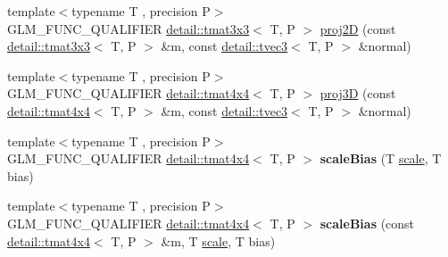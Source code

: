 \begin{DoxyCompactItemize}
\item 
{\footnotesize template$<$typename T , precision P$>$ }\\G\+L\+M\+\_\+\+F\+U\+N\+C\+\_\+\+Q\+U\+A\+L\+I\+F\+I\+ER \hyperlink{structglm_1_1detail_1_1tmat3x3}{detail\+::tmat3x3}$<$ T, P $>$ \hyperlink{group__gtx__transform2_gad51e1fa33875b966db2f97cb7f21c48a}{proj2D} (const \hyperlink{structglm_1_1detail_1_1tmat3x3}{detail\+::tmat3x3}$<$ T, P $>$ \&m, const \hyperlink{structglm_1_1detail_1_1tvec3}{detail\+::tvec3}$<$ T, P $>$ \&normal)
\item 
{\footnotesize template$<$typename T , precision P$>$ }\\G\+L\+M\+\_\+\+F\+U\+N\+C\+\_\+\+Q\+U\+A\+L\+I\+F\+I\+ER \hyperlink{structglm_1_1detail_1_1tmat4x4}{detail\+::tmat4x4}$<$ T, P $>$ \hyperlink{group__gtx__transform2_ga70a21b940727b94060fd3826eeacb048}{proj3D} (const \hyperlink{structglm_1_1detail_1_1tmat4x4}{detail\+::tmat4x4}$<$ T, P $>$ \&m, const \hyperlink{structglm_1_1detail_1_1tvec3}{detail\+::tvec3}$<$ T, P $>$ \&normal)
\item 
{\footnotesize template$<$typename T , precision P$>$ }\\G\+L\+M\+\_\+\+F\+U\+N\+C\+\_\+\+Q\+U\+A\+L\+I\+F\+I\+ER \hyperlink{structglm_1_1detail_1_1tmat4x4}{detail\+::tmat4x4}$<$ T, P $>$ {\bfseries scale\+Bias} (T \hyperlink{group__gtc__matrix__transform_gabd40959f269abd16c256a4f59ab03d62}{scale}, T bias)\hypertarget{namespaceglm_a5a113176ab39952ded7ecc6cf745d4d3}{}\label{namespaceglm_a5a113176ab39952ded7ecc6cf745d4d3}

\item 
{\footnotesize template$<$typename T , precision P$>$ }\\G\+L\+M\+\_\+\+F\+U\+N\+C\+\_\+\+Q\+U\+A\+L\+I\+F\+I\+ER \hyperlink{structglm_1_1detail_1_1tmat4x4}{detail\+::tmat4x4}$<$ T, P $>$ {\bfseries scale\+Bias} (const \hyperlink{structglm_1_1detail_1_1tmat4x4}{detail\+::tmat4x4}$<$ T, P $>$ \&m, T \hyperlink{group__gtc__matrix__transform_gabd40959f269abd16c256a4f59ab03d62}{scale}, T bias)\hypertarget{namespaceglm_a8ab0c3b1c92fcaf845bcb6ee9ea1c70e}{}\label{namespaceglm_a8ab0c3b1c92fcaf845bcb6ee9ea1c70e}


\end{DoxyCompactItemize}
